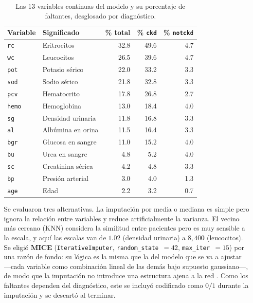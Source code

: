 \documentclass[11pt, a4paper]{article}
\begin{document}
\begin{table}[H]
\centering
\caption{Las 13 variables continuas del modelo y su porcentaje de faltantes, desglosado por
diagnóstico.}
\label{tab:variables}
\small
\renewcommand{\arraystretch}{1.12}
\begin{tabular}{l l r r r}
\toprule
\textbf{Variable} & \textbf{Significado} & \textbf{\% total} & \textbf{\% \texttt{ckd}} & \textbf{\% \texttt{notckd}} \\
\midrule
\texttt{rc}   & Eritrocitos        & 32.8 & 49.6 & 4.7 \\
\texttt{wc}   & Leucocitos         & 26.5 & 39.6 & 4.7 \\
\texttt{pot}  & Potasio sérico     & 22.0 & 33.2 & 3.3 \\
\texttt{sod}  & Sodio sérico       & 21.8 & 32.8 & 3.3 \\
\texttt{pcv}  & Hematocrito        & 17.8 & 26.8 & 2.7 \\
\texttt{hemo} & Hemoglobina        & 13.0 & 18.4 & 4.0 \\
\texttt{sg}   & Densidad urinaria  & 11.8 & 16.8 & 3.3 \\
\texttt{al}   & Albúmina en orina  & 11.5 & 16.4 & 3.3 \\
\texttt{bgr}  & Glucosa en sangre  & 11.0 & 15.2 & 4.0 \\
\texttt{bu}   & Urea en sangre     &  4.8 &  5.2 & 4.0 \\
\texttt{sc}   & Creatinina sérica  &  4.2 &  4.8 & 3.3 \\
\texttt{bp}   & Presión arterial   &  3.0 &  4.0 & 1.3 \\
\texttt{age}  & Edad               &  2.2 &  3.2 & 0.7 \\
\bottomrule
\end{tabular}
\end{table}

Se evaluaron tres alternativas. La imputación por media o mediana es simple pero ignora la
relación entre variables y reduce artificialmente la varianza. El vecino más cercano (KNN)
considera la similitud entre pacientes pero es muy sensible a la escala, y aquí las escalas van de
$1.02$ (densidad urinaria) a $8{,}400$ (leucocitos). Se eligió \textbf{MICE}
(\texttt{IterativeImputer}, \texttt{random\_state}~$=42$, \texttt{max\_iter}~$=15$) por una razón
de fondo: su lógica es la misma que la del modelo que se va a ajustar —cada variable como
combinación lineal de las demás bajo supuesto gaussiano—, de modo que la imputación no introduce
una estructura ajena a la red \cite{vanbuuren2011}. Como los faltantes dependen del diagnóstico,
este se incluyó codificado como $0/1$ durante la imputación y se descartó al terminar.
\end{document}
